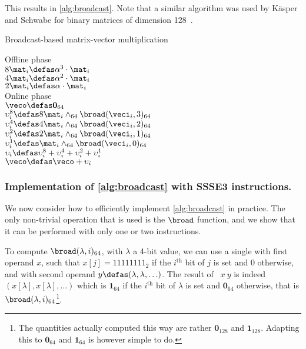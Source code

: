 This results in \autoref{alg:broadcast}. Note that a similar algorithm was used by Käsper and Schwabe for binary
matrices of dimension 128~\cite{DBLP:conf/ches/KasperS09}.

\begin{algorithm}[!htb]
  \caption{Broadcast-based matrix-vector multiplication}
\label{alg:broadcast}
  Offline phase\\
  {
  $8\mat_i \defas \alpha^3\cdot\mat_i$\\
  $4\mat_i \defas \alpha^2\cdot\mat_i$\\
  $2\mat_i \defas \alpha\cdot\mat_i$\\
  }
  Online phase\\
  $\veco \defas \mathbf{0}_{64}$\\
  {
  $\upsilon_i^8 \defas 8\mat_i \wedge_{64} \broad(\veci_i,3)_{64}$\\
  $\upsilon_i^4 \defas 4\mat_i \wedge_{64} \broad(\veci_i,2)_{64}$\\
  $\upsilon_i^2 \defas 2\mat_i \wedge_{64} \broad(\veci_i,1)_{64}$\\
  $\upsilon_i^1 \defas  \mat_i \wedge_{64} \broad(\veci_i,0)_{64}$\\
  $\upsilon_i \defas \upsilon_i^8 + \upsilon_i^4 + \upsilon_i^2 + \upsilon_i^1$\\
  $\veco \defas \veco + \upsilon_i$\\
  }
  \Return{$\veco$}
\end{algorithm}


\subsubsection{Implementation of \autoref{alg:broadcast} with SSSE3 instructions.}
We now consider how to efficiently implement \autoref{alg:broadcast} in practice. The only
non-trivial operation that is used is the $\broad$ function, and we show that it can be performed
with only one or two \pshufb{} instructions.

To compute $\broad(\lambda,i)_{64}$, with $\lambda$ a 4-bit value,
we can use a single \pshufb{} with first operand
$x$, such that $x[j] = 11111111_2$ if the $i^\text{th}$ bit of $j$ is set and 0 otherwise, and with second operand $y \defas (\lambda, \lambda, \ldots)$.
The result of \pshufb{}~$x~y$ is indeed $(x[\lambda], x[\lambda], \ldots)$ which is $\mathbf{1}_{64}$ if the $i^\text{th}$
bit of $\lambda$ is set and $\mathbf{0}_{64}$ otherwise, that is $\broad(\lambda, i)_{64}$\footnote{The quantities actually
computed this way are rather $\mathbf{0}_{128}$ and $\mathbf{1}_{128}$. Adapting this to $\mathbf{0}_{64}$
and $\mathbf{1}_{64}$ is however simple to do.}.

